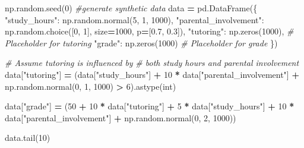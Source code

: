 \documentclass[
  12pt,
]{book}
\newenvironment{Shaded}{\begin{snugshade}}{\end{snugshade}}
\newcommand{\BuiltInTok}[1]{#1}
\newcommand{\CommentTok}[1]{\textcolor[rgb]{0.56,0.35,0.01}{\textit{#1}}}
\newcommand{\DecValTok}[1]{\textcolor[rgb]{0.00,0.00,0.81}{#1}}
\newcommand{\FloatTok}[1]{\textcolor[rgb]{0.00,0.00,0.81}{#1}}
\newcommand{\NormalTok}[1]{#1}
\newcommand{\OperatorTok}[1]{\textcolor[rgb]{0.81,0.36,0.00}{\textbf{#1}}}
\newcommand{\StringTok}[1]{\textcolor[rgb]{0.31,0.60,0.02}{#1}}
\begin{document}
\begin{Shaded}
\begin{Highlighting}[]
\NormalTok{np.random.seed(}\DecValTok{0}\NormalTok{)}
\CommentTok{\#generate synthetic data}
\NormalTok{data }\OperatorTok{=}\NormalTok{ pd.DataFrame(\{}
    \StringTok{"study\_hours"}\NormalTok{: np.random.normal(}\DecValTok{5}\NormalTok{, }\DecValTok{1}\NormalTok{, }\DecValTok{1000}\NormalTok{),  }
    \StringTok{"parental\_involvement"}\NormalTok{: np.random.choice([}\DecValTok{0}\NormalTok{, }\DecValTok{1}\NormalTok{], }
\NormalTok{                                             size}\OperatorTok{=}\DecValTok{1000}\NormalTok{, }
\NormalTok{                                             p}\OperatorTok{=}\NormalTok{[}\FloatTok{0.7}\NormalTok{, }\FloatTok{0.3}\NormalTok{]),  }
    \StringTok{"tutoring"}\NormalTok{: np.zeros(}\DecValTok{1000}\NormalTok{),  }\CommentTok{\# Placeholder for tutoring}
    \StringTok{"grade"}\NormalTok{: np.zeros(}\DecValTok{1000}\NormalTok{)  }\CommentTok{\# Placeholder for grade}
\NormalTok{\})}

\CommentTok{\# Assume tutoring is influenced by }
\CommentTok{\# both study hours and parental involvement}
\NormalTok{data[}\StringTok{"tutoring"}\NormalTok{] }\OperatorTok{=}\NormalTok{ (data[}\StringTok{"study\_hours"}\NormalTok{] }
            \OperatorTok{+} \DecValTok{10} \OperatorTok{*}\NormalTok{ data[}\StringTok{"parental\_involvement"}\NormalTok{] }
            \OperatorTok{+}\NormalTok{ np.random.normal(}\DecValTok{0}\NormalTok{, }\DecValTok{1}\NormalTok{, }\DecValTok{1000}\NormalTok{) }\OperatorTok{\textgreater{}} \DecValTok{6}\NormalTok{).astype(}\BuiltInTok{int}\NormalTok{)}

\NormalTok{data[}\StringTok{"grade"}\NormalTok{] }\OperatorTok{=}\NormalTok{ (}\DecValTok{50} \OperatorTok{+} \DecValTok{10} \OperatorTok{*}\NormalTok{ data[}\StringTok{"tutoring"}\NormalTok{] }
                    \OperatorTok{+} \DecValTok{5} \OperatorTok{*}\NormalTok{ data[}\StringTok{"study\_hours"}\NormalTok{] }
                    \OperatorTok{+} \DecValTok{10} \OperatorTok{*}\NormalTok{ data[}\StringTok{"parental\_involvement"}\NormalTok{] }
                    \OperatorTok{+}\NormalTok{ np.random.normal(}\DecValTok{0}\NormalTok{, }\DecValTok{2}\NormalTok{, }\DecValTok{1000}\NormalTok{))}

\NormalTok{data.tail(}\DecValTok{10}\NormalTok{)}
\end{Highlighting}
\end{Shaded}
\end{document}
